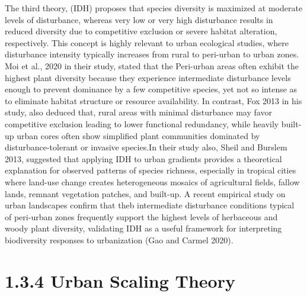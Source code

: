 The third theory, (IDH) proposes that species diversity is maximized at moderate levels of disturbance, whereas very low or very high disturbance results in reduced diversity due to competitive exclusion or severe habitat alteration, respectively. This concept is highly relevant to urban ecological studies, where disturbance intensity typically increases from rural to peri-urban to urban zones. Moi et al., 2020 in their study, stated that the Peri-urban areas often exhibit the highest plant diversity because they experience intermediate disturbance levels enough to prevent dominance by a few competitive species, yet not so intense as to eliminate habitat structure or resource availability. In contrast, Fox 2013 in his study, also deduced that, rural areas with minimal disturbance may favor competitive exclusion leading to lower functional redundancy, while heavily built-up urban cores often show simplified plant communities dominated by disturbance-tolerant or invasive species.In their study also, Sheil and Burslem 2013, suggested that applying IDH to urban gradients provides a theoretical explanation for observed patterns of species richness, especially in tropical cities where land-use change creates heterogeneous mosaics of agricultural fields, fallow lands, remnant vegetation patches, and built-up. A recent empirical study on urban landscapes confirm that theb intermediate disturbance conditions typical of peri-urban zones frequently support the highest levels of herbaceous and woody plant diversity, validating IDH as a useful framework for interpreting biodiversity responses to urbanization (Gao and Carmel 2020).
\hypertarget{urban-scaling-theory}{%
\section{\texorpdfstring{\textbf{1.3.4 Urban Scaling Theory}}{1.3.4 Urban Scaling Theory}}\label{urban-scaling-theory}}

